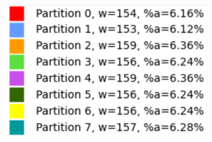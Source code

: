 \begin{figure}[h]
\centering
\begin{subfigure}{.33\textwidth}
    \centering
    \caption[short]{}
\end{subfigure}%
\begin{subfigure}{.33\textwidth}
    \centering
    \caption[short]{}
\end{subfigure}%
\begin{subfigure}{.33\textwidth}
    \centering
    \includegraphics[width=0.9\linewidth]{images/results/m_k/with/4/results}

\end{subfigure}
\end{figure}
